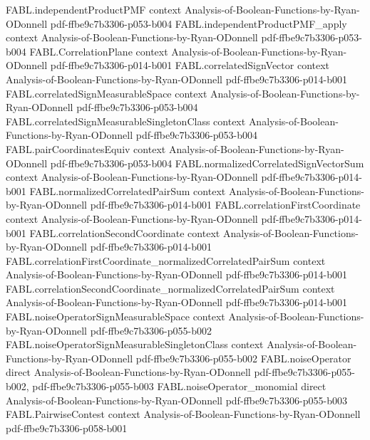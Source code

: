 \begin{theorem}
  {FABL.independentProductPMF}
  {context}
  {Analysis-of-Boolean-Functions-by-Ryan-ODonnell}
  {pdf-ffbe9c7b3306-p053-b004}
\proofstep
  {FABL.independentProductPMF_apply}
  {context}
  {Analysis-of-Boolean-Functions-by-Ryan-ODonnell}
  {pdf-ffbe9c7b3306-p053-b004}
\proofstep
  {FABL.CorrelationPlane}
  {context}
  {Analysis-of-Boolean-Functions-by-Ryan-ODonnell}
  {pdf-ffbe9c7b3306-p014-b001}
\proofstep
  {FABL.correlatedSignVector}
  {context}
  {Analysis-of-Boolean-Functions-by-Ryan-ODonnell}
  {pdf-ffbe9c7b3306-p014-b001}
\proofstep
  {FABL.correlatedSignMeasurableSpace}
  {context}
  {Analysis-of-Boolean-Functions-by-Ryan-ODonnell}
  {pdf-ffbe9c7b3306-p053-b004}
\proofstep
  {FABL.correlatedSignMeasurableSingletonClass}
  {context}
  {Analysis-of-Boolean-Functions-by-Ryan-ODonnell}
  {pdf-ffbe9c7b3306-p053-b004}
\proofstep
  {FABL.pairCoordinatesEquiv}
  {context}
  {Analysis-of-Boolean-Functions-by-Ryan-ODonnell}
  {pdf-ffbe9c7b3306-p053-b004}
\proofstep
  {FABL.normalizedCorrelatedSignVectorSum}
  {context}
  {Analysis-of-Boolean-Functions-by-Ryan-ODonnell}
  {pdf-ffbe9c7b3306-p014-b001}
\proofstep
  {FABL.normalizedCorrelatedPairSum}
  {context}
  {Analysis-of-Boolean-Functions-by-Ryan-ODonnell}
  {pdf-ffbe9c7b3306-p014-b001}
\proofstep
  {FABL.correlationFirstCoordinate}
  {context}
  {Analysis-of-Boolean-Functions-by-Ryan-ODonnell}
  {pdf-ffbe9c7b3306-p014-b001}
\proofstep
  {FABL.correlationSecondCoordinate}
  {context}
  {Analysis-of-Boolean-Functions-by-Ryan-ODonnell}
  {pdf-ffbe9c7b3306-p014-b001}
\proofstep
  {FABL.correlationFirstCoordinate_normalizedCorrelatedPairSum}
  {context}
  {Analysis-of-Boolean-Functions-by-Ryan-ODonnell}
  {pdf-ffbe9c7b3306-p014-b001}
\proofstep
  {FABL.correlationSecondCoordinate_normalizedCorrelatedPairSum}
  {context}
  {Analysis-of-Boolean-Functions-by-Ryan-ODonnell}
  {pdf-ffbe9c7b3306-p014-b001}
\proofstep
  {FABL.noiseOperatorSignMeasurableSpace}
  {context}
  {Analysis-of-Boolean-Functions-by-Ryan-ODonnell}
  {pdf-ffbe9c7b3306-p055-b002}
\proofstep
  {FABL.noiseOperatorSignMeasurableSingletonClass}
  {context}
  {Analysis-of-Boolean-Functions-by-Ryan-ODonnell}
  {pdf-ffbe9c7b3306-p055-b002}
\proofstep
  {FABL.noiseOperator}
  {direct}
  {Analysis-of-Boolean-Functions-by-Ryan-ODonnell}
  {pdf-ffbe9c7b3306-p055-b002,
    pdf-ffbe9c7b3306-p055-b003}
\proofstep
  {FABL.noiseOperator_monomial}
  {direct}
  {Analysis-of-Boolean-Functions-by-Ryan-ODonnell}
  {pdf-ffbe9c7b3306-p055-b003}
\proofstep
  {FABL.PairwiseContest}
  {context}
  {Analysis-of-Boolean-Functions-by-Ryan-ODonnell}
  {pdf-ffbe9c7b3306-p058-b001}

\end{theorem}
